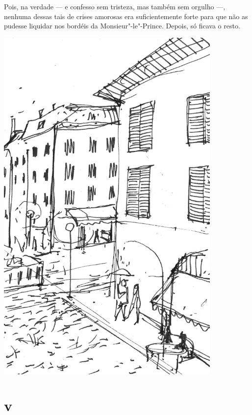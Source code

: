 Pois, na verdade --- e confesso sem tristeza, mas também sem orgulho ---,
nenhuma dessas tais de crises amorosas era suficientemente forte
para que não as pudesse liquidar nos bordéis da Monsieur"-le"-Prince.
Depois, só ficava o resto.

\pagebreak
\thispagestyle{empty}

\begin{center}
\vspace*{-1.9cm}
\hspace*{-1.45cm}\includegraphics[width=111mm]{./imgs/rua.jpg}
\end{center}

\section{v}

